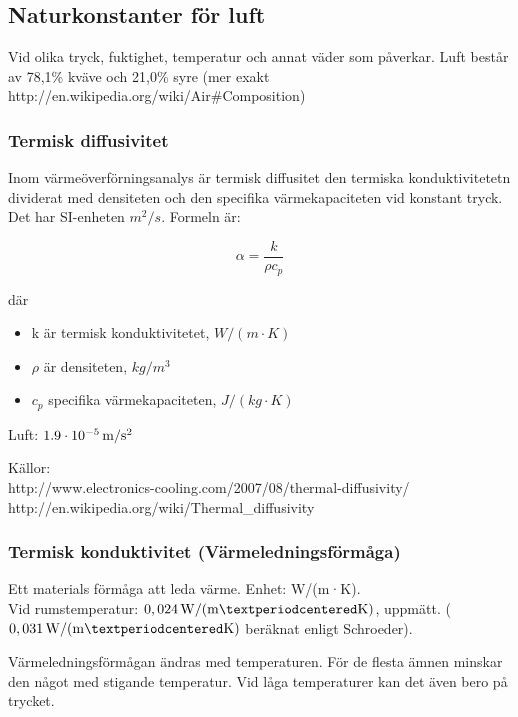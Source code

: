 \subsection{Naturkonstanter för luft}

Vid olika tryck, fuktighet, temperatur och annat väder som påverkar. Luft består av 78,1\% kväve och 21,0\% syre (mer exakt http://en.wikipedia.org/wiki/Air\#Composition)


\subsubsection{Termisk diffusivitet} %
Inom värmeöverförningsanalys är termisk diffusitet den termiska konduktivitetetn dividerat med densiteten och den specifika värmekapaciteten vid konstant tryck. Det har SI-enheten $m^2/s$. Formeln är:

\begin{equation}
\alpha=\frac{k}{\rho c_p}
\end{equation}

där 
\begin{itemize}
   \item[] k är termisk konduktivitetet, $\unit{W/(m·K)}$
   \item[] $\rho$ är densiteten, $\unit{kg/m^3}$
   \item[] $c_p$ specifika värmekapaciteten, $\unit{J/(kg·K)}$
\end{itemize}

Luft: $\unit[1.9\cdot10^{-5}]{m/s^2}$

Källor:\\
http://www.electronics-cooling.com/2007/08/thermal-diffusivity/\\
http://en.wikipedia.org/wiki/Thermal\_diffusivity\\


\subsubsection{Termisk konduktivitet (Värmeledningsförmåga)} %
Ett materials förmåga att leda värme. Enhet: W/(m·K).\\
Vid rumstemperatur: $\unit[0,024]{W/(m·K)}$, uppmätt. ($\unit[0,031]{W/(m·K)}$ beräknat enligt Schroeder).

Värmeledningsförmågan ändras med temperaturen. För de flesta ämnen minskar den något med stigande temperatur. Vid låga temperaturer kan det även bero på trycket.

